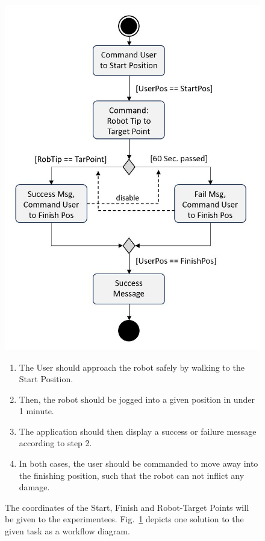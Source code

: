 \begin{figure}[!h]
	\begin{minipage}{0.4\textwidth}
		\centering
		\includegraphics[width=1\linewidth]{Figures/Evaluation2_workflow}
		\caption[Evaluation 2 UseCase Workflow]{}
		\label{Fig:Evaluation2Workflow}
	\end{minipage}\hfill
	\begin{minipage}{0.55\textwidth}
		\begin{enumerate}
			\item The User should approach the robot safely by walking to the Start Position.
			\item Then, the robot should be jogged into a given position in under 1 minute.
			\item The application should then display a success or failure message according to step 2.
			\item In both cases, the user should be commanded to move away into the finishing position, such that the robot can not inflict any damage.
		\end{enumerate} 
		The coordinates of the Start, Finish and Robot-Target Points will be given to the experimentees. Fig.~\ref{Fig:Evaluation2Workflow} depicts one solution to the given task as a workflow diagram. 
	\end{minipage}
\end{figure}

